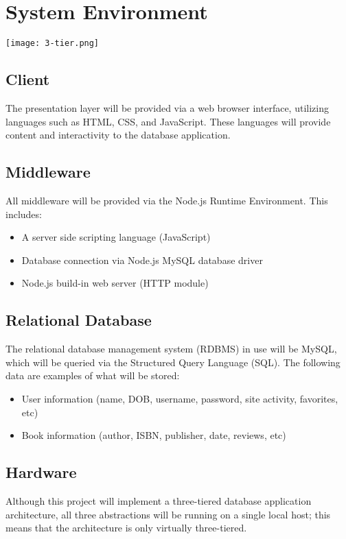 \documentclass[letter, 12pt, titlepage]{article}
\begin{document}
	\section{System Environment}

	\texttt{[image: 3-tier.png]}

	\subsection{Client}
		The presentation layer will be provided via a web browser interface, utilizing languages such as HTML, CSS, and JavaScript. These languages will provide content and interactivity to the database application.
	\subsection{Middleware}
		All middleware will be provided via the Node.js Runtime Environment. This includes:
	\begin{itemize}
		\item A server side scripting language (JavaScript)
		\item Database connection via Node.js MySQL database driver
		\item Node.js build-in web server (HTTP module)
	\end{itemize}

	\subsection{Relational Database}
		The relational database management system (RDBMS) in use will be MySQL, which will be queried via the Structured Query Language (SQL). The following data are examples of what will be stored:
	\begin{itemize}
		\item User information (name, DOB, username, password, site activity, favorites, etc)
		\item Book information (author, ISBN, publisher, date, reviews, etc)
	\end{itemize}

	\subsection{Hardware}
		Although this project will implement a three-tiered database application architecture, all three abstractions will be running on a single local host; this means that the architecture is only virtually three-tiered.
\end{document}

